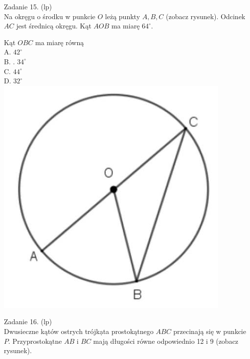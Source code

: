 \documentclass[10pt]{article}
\begin{document}
Zadanie 15. (lp)\\
Na okręgu o środku w punkcie \(O\) leżą punkty \(A, B, C\) (zobacz rysunek). Odcinek \(A C\) jest średnicą okręgu. Kąt \(A O B\) ma miarę \(64^{\circ}\).

Kąt \(O B C\) ma miarę równą\\
A. \(42^{\circ}\)\\
B. . \(34^{\circ}\)\\
C. \(44^{\circ}\)\\
D. \(32^{\circ}\)\\
\includegraphics[max width=\textwidth, center]{2024_11_21_e376e4ee4a8b7ab03731g-04(1)}

Zadanie 16. (lp)\\
Dwusieczne kątów ostrych trójkạta prostokątnego \(A B C\) przecinają się w punkcie \(P\). Przyprostokątne \(A B\) i \(B C\) mają długości równe odpowiednio 12 i 9 (zobacz rysunek).
\end{document}
